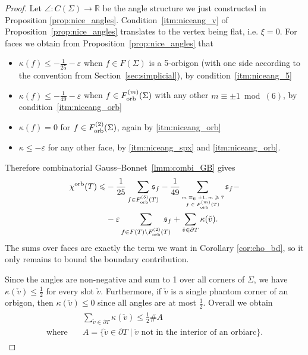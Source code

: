 \documentclass{amsart}
\newcommand{\cho}{\chi^{\textnormal{orb}}}
\newcommand{\Forb}[1][m]{F^{(#1)}_{\textnormal{orb}}}
\begin{document}
\begin{proof}
Let $\angle\colon C(\Sigma)\to\mathbb{R}$ be the angle structure we just constructed in Proposition \ref{prop:nice_angles}. Condition~\ref*{itm:niceang_v} of Proposition~\ref{prop:nice_angles} translates to the vertex being flat, i.e. $\xi=0$. For faces we obtain from Proposition~\ref{prop:nice_angles} that
\begin{itemize}
\item $\kappa(f)\leqslant-\tfrac{1}{25}-\varepsilon$ when $f\in F(\Sigma)$ is a 5-orbigon (with one side according to the convention from Section~\ref{sec:simplicial}), by condition~\ref*{itm:niceang_5}
\item $\kappa(f)\leqslant-\tfrac{1}{49}-\varepsilon$ when $f\in\Forb(\Sigma)$ with any other $m\equiv\pm1\bmod(6)$, by condition~\ref*{itm:niceang_orb}
\item $\kappa(f)=0$ for $f\in\Forb[2](\Sigma)$, again by \ref*{itm:niceang_orb}
\item $\kappa\leqslant-\varepsilon$ for any other face, by \ref*{itm:niceang_spx} and \ref*{itm:niceang_orb}.
\end{itemize}
Therefore combinatorial Gauss--Bonnet~\ref{lmm:combi_GB} gives
\begin{align}\begin{split}\label{eq:GB_application}
\cho(T)\leqslant&-\frac{1}{25}\sum_{f\in\Forb[5](T)}\hspace*{-10pt}\mathfrak{s}_f-\frac{1}{49}\sum_{\tiny\begin{matrix}m\equiv_6\pm1,m\geqslant7\\f\in\Forb(T)\end{matrix}}\mathfrak{s}_f-\\
&-\varepsilon\sum_{f\in F(T)\setminus\Forb[2](T)}\hspace*{-10pt}\mathfrak{s}_f+\sum_{\check{v}\in\partial T}\kappa(\check{v}).
\end{split}\end{align}
The sums over faces are exactly the term we want in Corollary \ref{cor:cho_bd}, so it only remains to bound the boundary contribution.

Since the angles are non-negative and sum to 1 over all corners of $\Sigma$, we have $\kappa(\check{v})\leqslant\tfrac{1}{2}$ for every slot $\check{v}$. Furthermore, if $\check{v}$ is a single phantom corner of an orbigon, then $\kappa(\check{v})\leqslant0$ since all angles are at most $\tfrac{1}{2}$. Overall we obtain
\begin{align}\begin{split}\label{eq:bdry_curv_bd}
&\sum_{\check{v}\in\partial T}\kappa(\check{v})\leqslant\frac{1}{2}\#A\\
\text{where}\quad&A=\{\check{v}\in\partial T\mid\check{v}\text{ not in the interior of an orbiarc}\}.
\end{split}\end{align}


\end{proof}
\end{document}
